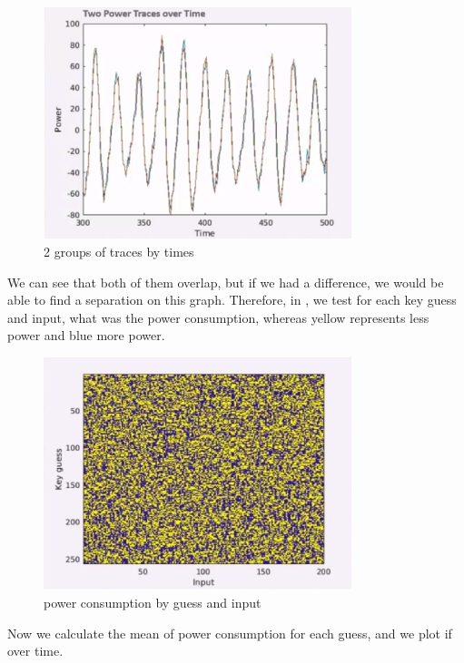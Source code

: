\begin{figure}[!ht]
    \centering
    \includegraphics[width=0.8\textwidth]{images/Lecture6/2traces-by-time.png}
    \caption{2 groups of traces by times} \label{fig:2traces-by-time}
\end{figure}

We can see that both of them overlap, but if we had a difference, we would be able to find a separation on this graph.
Therefore, in , we test for each key guess and input, what was the power consumption, whereas yellow represents less power and blue more power.

\begin{figure}[!ht]
    \centering
    \includegraphics[width=0.8\textwidth]{images/Lecture6/intensity_by_guess.png}
    \caption{power consumption by guess and input} \label{fig:intensity_by_guess}
\end{figure}

Now we calculate the mean of power consumption for each guess, and we plot if over time.

